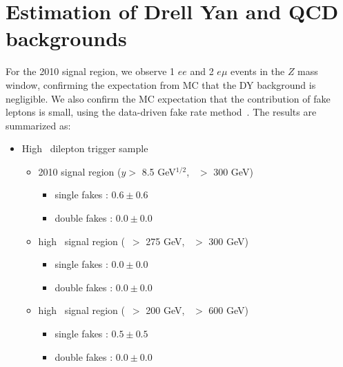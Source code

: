 \section{Estimation of Drell Yan and QCD backgrounds}
\label{sec:dyFR}

For the 2010 signal region, we observe 1 $ee$ and 2 $e\mu$ events in the $Z$ mass window,
confirming the expectation from MC that the DY background is negligible. We also confirm 
the MC expectation that the contribution of fake leptons is small, using the data-driven fake
rate method~\cite{ref:FR}. The results are summarized as:

\begin{itemize}
\item High \pt\ dilepton trigger sample
\begin{itemize}
\item 2010 signal region ($y >$ 8.5 GeV$^{1/2}$, \Ht\ $>$ 300 GeV)
   \begin{itemize} 
   \item single fakes : $0.6 \pm 0.6$
   \item double fakes : $0.0 \pm 0.0$
   \end{itemize}  
\item high \met\ signal region (\met\ $>$ 275 GeV, \Ht\ $>$ 300 GeV)
   \begin{itemize} 
   \item single fakes : $0.0 \pm 0.0$
   \item double fakes : $0.0 \pm 0.0$
   \end{itemize}  
\item high \Ht\ signal region (\met\ $>$ 200 GeV, \Ht\ $>$ 600 GeV)
   \begin{itemize} 
   \item single fakes : $0.5 \pm 0.5$
   \item double fakes : $0.0 \pm 0.0$
   \end{itemize}  
\end{itemize}

\clearpage


\end{itemize}

